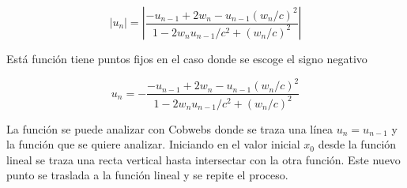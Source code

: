 \documentclass[11pt, spanish]{article}
\begin{document}
\begin{equation}
    \left| u_n \right| = \left|  \dfrac{-u_{n-1} + 2w_n - u_{n-1}(w_n/c)^2}{1 - 2w_n u_{n-1}/c^2 + (w_n/c)^2} \right|
\end{equation}

Está función tiene puntos fijos en el caso donde se escoge el signo negativo 

\begin{equation*}
    u_n = -\dfrac{-u_{n-1} + 2w_n - u_{n-1}(w_n/c)^2}{1 - 2w_n u_{n-1}/c^2 + (w_n/c)^2}
\end{equation*}

La función se puede analizar con Cobwebs donde se traza una línea \( u_n = u_{n-1} \) y la función que se quiere analizar. Iniciando en el valor inicial \( x_0 \) desde la función lineal se traza una recta vertical hasta intersectar con la otra función. Este nuevo punto se traslada a la función lineal y se repite el proceso. 
\end{document}

